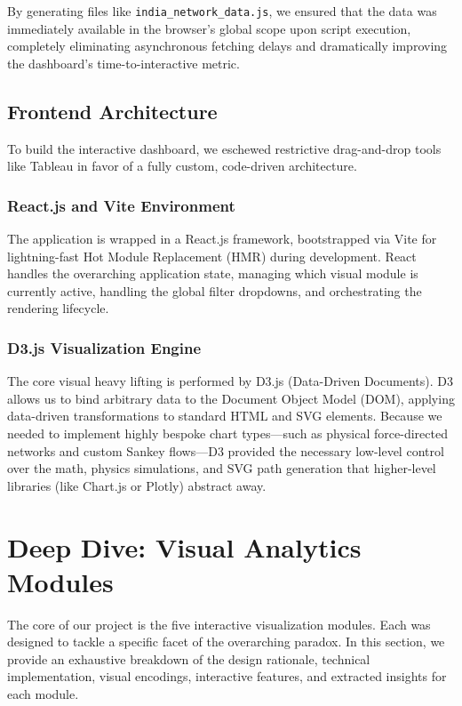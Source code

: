 \documentclass[12pt,a4paper]{article}
\begin{document}
By generating files like \texttt{india\_network\_data.js}, we ensured that the data was immediately available in the browser's global scope upon script execution, completely eliminating asynchronous fetching delays and dramatically improving the dashboard's time-to-interactive metric.

\subsection{Frontend Architecture}
To build the interactive dashboard, we eschewed restrictive drag-and-drop tools like Tableau in favor of a fully custom, code-driven architecture. 

\subsubsection{React.js and Vite Environment}
The application is wrapped in a React.js framework, bootstrapped via Vite for lightning-fast Hot Module Replacement (HMR) during development. React handles the overarching application state, managing which visual module is currently active, handling the global filter dropdowns, and orchestrating the rendering lifecycle.

\subsubsection{D3.js Visualization Engine}
The core visual heavy lifting is performed by D3.js (Data-Driven Documents). D3 allows us to bind arbitrary data to the Document Object Model (DOM), applying data-driven transformations to standard HTML and SVG elements. Because we needed to implement highly bespoke chart types---such as physical force-directed networks and custom Sankey flows---D3 provided the necessary low-level control over the math, physics simulations, and SVG path generation that higher-level libraries (like Chart.js or Plotly) abstract away.

\newpage
\section{Deep Dive: Visual Analytics Modules}
The core of our project is the five interactive visualization modules. Each was designed to tackle a specific facet of the overarching paradox. In this section, we provide an exhaustive breakdown of the design rationale, technical implementation, visual encodings, interactive features, and extracted insights for each module.
\end{document}
